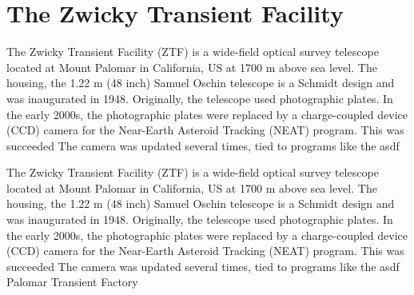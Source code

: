 \setchapterpreamble[u]{\margintoc}
\chapter{The Zwicky Transient Facility}

The Zwicky Transient Facility (ZTF) is a wide-field optical survey telescope located at Mount Palomar in California, US at 1700 m above sea level. The housing, the 1.22 m (48 inch) Samuel Oschin telescope is a Schmidt design and was inaugurated in 1948. Originally, the telescope used photographic plates. In the early 2000s, the photographic plates were replaced by a charge-coupled device (CCD) camera for the Near-Earth Asteroid Tracking (NEAT) program. This was succeeded 
 The camera was updated several times, tied to programs like the asdf


The Zwicky Transient Facility (ZTF) is a wide-field optical survey telescope located at Mount Palomar in California, US at 1700 m above sea level. The housing, the 1.22 m (48 inch) Samuel Oschin telescope is a Schmidt design and was inaugurated in 1948. Originally, the telescope used photographic plates. In the early 2000s, the photographic plates were replaced by a charge-coupled device (CCD) camera for the Near-Earth Asteroid Tracking (NEAT) program. This was succeeded 
 The camera was updated several times, tied to programs like the asdf
Palomar Transient Factory \cite{Law2009}